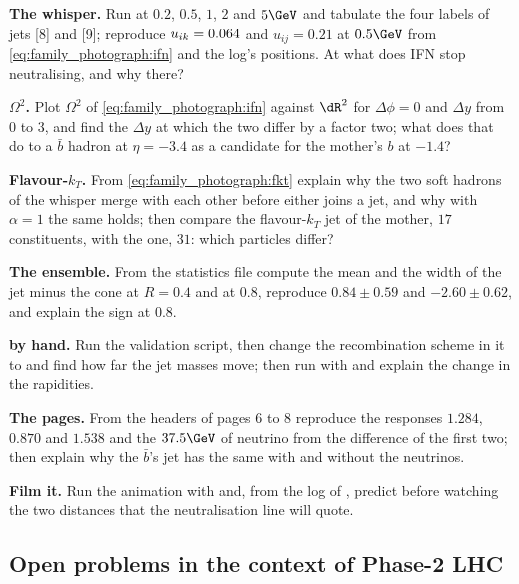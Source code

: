 \begin{exercises}
\item \textbf{The whisper.} Run  at $0.2$, $0.5$, $1$,
  $2$ and $5\GeV$ and tabulate the four labels of jets [8] and [9];
  reproduce $u_{ik}=0.064$ and $u_{ij}=0.21$ at $0.5\GeV$ from
  \cref{eq:family_photograph:ifn} and the log's positions. At what \pt
  does IFN stop neutralising, and why there?
\item \textbf{$\Omega^2$.} Plot $\Omega^2$ of \cref{eq:family_photograph:ifn}
  against $\dR^2$ for $\Delta\phi=0$ and $\Delta y$ from $0$ to $3$, and
  find the $\Delta y$ at which the two differ by a factor two; what does
  that do to a $\bar b$ hadron at $\eta=-3.4$ as a candidate for the
  mother's $b$ at $-1.4$?
\item \textbf{Flavour-$k_T$.} From \cref{eq:family_photograph:fkt} explain
  why the two soft hadrons of the whisper merge with each other before
  either joins a jet, and why with $\alpha=1$ the same holds; then
  compare the flavour-$k_T$ jet of the mother, $17$ constituents, with
  the \antikt one, $31$: which particles differ?
\item \textbf{The ensemble.} From the statistics file compute the mean
  and the width of the jet minus the cone at $R=0.4$ and at $0.8$,
  reproduce $0.84\pm0.59$ and $-2.60\pm0.62$, and explain the sign at
  $0.8$.
\item \textbf{\FASTJET by hand.} Run the validation script, then change
  the recombination scheme in it to  and find how far
  the jet masses move; then run  with 
  and explain the change in the rapidities.
\item \textbf{The \CMSSW pages.} From the headers of pages 6 to 8
  reproduce the responses $1.284$, $0.870$ and $1.538$ and the $37.5\GeV$
  of neutrino from the difference of the first two; then explain why the
  $\bar b$'s jet has the same \pt with and without the neutrinos.
\item \textbf{Film it.} Run the animation with 
  and, from the  log of , predict before
  watching the two distances that the neutralisation line will quote.
\end{exercises}

\subsection*{Open problems in the context of Phase-2 LHC}
\label{sec:family_photograph:open_problems}

